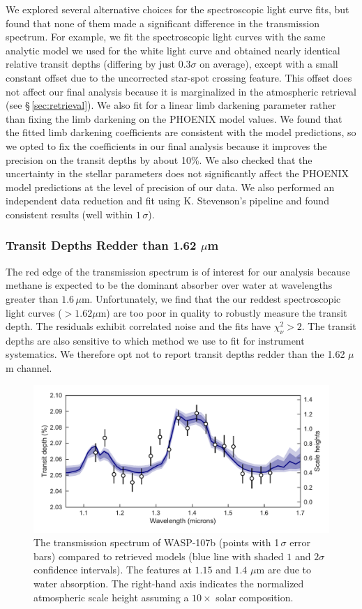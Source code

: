 \documentclass[twocolumn]{aastex61}
\begin{document}
We explored several alternative choices for the spectroscopic light curve fits, but found that none of them made a significant difference in the transmission spectrum. For example, we fit the spectroscopic light curves with the same analytic model we used for the white light curve and obtained nearly identical relative transit depths (differing by just $0.3\sigma$ on average), except with a small constant offset due to the uncorrected star-spot crossing feature. This offset does not affect our final analysis because it is marginalized in the atmospheric retrieval (see \S\,\ref{sec:retrieval}). We also fit for a linear limb darkening parameter rather than fixing the limb darkening on the PHOENIX model values. We found that the fitted limb darkening coefficients are consistent with the model predictions, so we opted to fix the coefficients in our final analysis because it improves the precision on the transit depths by about 10\%. We also checked that the uncertainty in the stellar parameters does not significantly affect the PHOENIX model predictions at the level of precision of our data.  We also performed an independent data reduction and fit using K. Stevenson's pipeline and found consistent results (well within $1\,\sigma$). 

\subsubsection{Transit Depths Redder than 1.62 $\mu$m}
The red edge of the transmission spectrum is of interest for our analysis because methane is expected to be the dominant absorber over water at wavelengths greater than $1.6\,\mu$m. Unfortunately, we find that the our reddest spectroscopic light curves ($>1.62\mu$m) are too poor in quality to robustly measure the transit depth. The residuals exhibit correlated noise and the fits have $\chi^2_\nu>2$. The transit depths are also sensitive to which method we use to fit for instrument systematics.  We therefore opt not to report transit depths redder than the 1.62 $\mu$m channel.


\begin{figure}
\includegraphics[width = \textwidth]{Figures/spectrum.pdf}
\caption{The transmission spectrum of WASP-107b (points with 1\,$\sigma$ error bars) compared to retrieved models (blue line with shaded $1$ and $2\sigma$ confidence intervals). The features at $1.15$ and $1.4$ $\mu$m are due to water absorption. The right-hand axis indicates the normalized atmospheric scale height assuming a $10\times$ solar composition.}
\label{fig:spectrum}
\end{figure}
\end{document}
